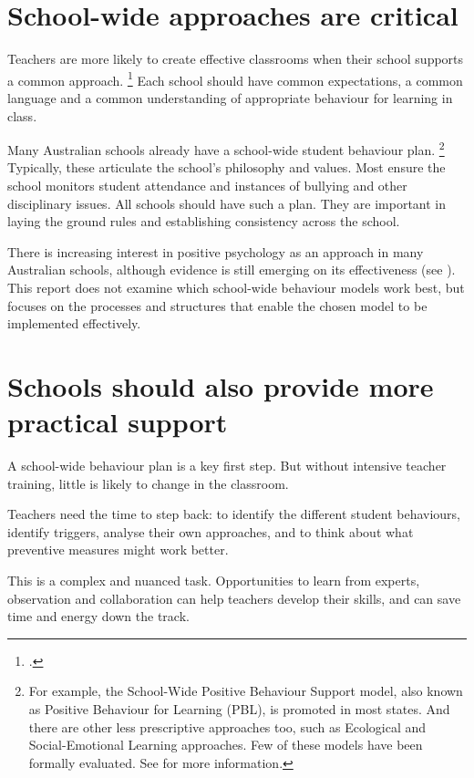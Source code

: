 \documentclass[FrontPage]{grattan}
\begin{document}
\section{School-wide approaches are critical}\label{sec:consistent-school-wide-approaches}
Teachers are more likely to create effective classrooms when their school supports a common approach.%
    \footcite{Epstein2008ReducingBehaviorProblems}
Each school should have common expectations, a common language and a common understanding of appropriate behaviour for learning in class.

Many Australian schools already have a school-wide student behaviour plan.%
    \footnote{For example, the School-Wide Positive Behaviour Support model, also known as Positive Behaviour for Learning (PBL), is promoted in most states. And there are other less prescriptive approaches too, such as Ecological and Social-Emotional Learning approaches. Few of these models have been formally evaluated. See \textcite{ONeillStephenson2014EvidenceBasedClassroom} for more information.}
Typically, these articulate the school’s philosophy and values. Most ensure the school monitors student attendance and instances of bullying and other disciplinary issues. All schools should have such a plan. They are important in laying the ground rules and establishing consistency across the school.


There is increasing interest in positive psychology as an approach in many Australian schools, although evidence is still emerging on its effectiveness (see ). This report does not examine which school-wide behaviour models work best, but focuses on the processes and structures that enable the chosen model to be implemented effectively. 

\section{Schools should also provide more practical support}\label{sec:school-behaviour-plans}
A school-wide behaviour plan is a key first step. But without intensive teacher training, little is likely to change in the classroom. 
 
Teachers need the time to step back: to identify the different student behaviours, identify triggers, analyse their own approaches, and to think about what preventive measures might work better. 
 
This is a complex and nuanced task. Opportunities to learn from experts, observation and collaboration can help teachers develop their skills, and can save time and energy down the track. 
 
\end{document}
